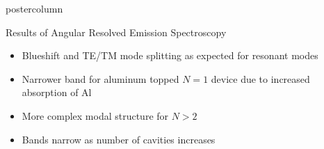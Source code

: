 \documentclass[final]{beamer}
\begin{document}
\begin{frame}
\begin{columns}
\begin{column}{.49\textwidth}
\begin{beamercolorbox}[center,wd=\textwidth]{postercolumn}
\begin{minipage}[T]{.99\textwidth}
{			\vspace{1cm}
            \begin{block}{Results of Angular Resolved Emission Spectroscopy}
                \begin{minipage}{0.35\textwidth}
                    \vspace{-2cm}
                    \begin{itemize}
                     \item Blueshift and TE/TM mode splitting as expected for resonant modes \cite{Stavrinou1999} \newline
                     \item Narrower band for aluminum topped $N=1$ device due to increased absorption of Al \cite{Schulz1954} \newline
                     \item More complex modal structure for $N>2$ \newline
                     \item Bands narrow as number of cavities increases
                    \end{itemize}

\end{minipage}
\end{block}}
\end{minipage}
\end{beamercolorbox}
\end{column}
\end{columns}
\end{frame}
\end{document}
